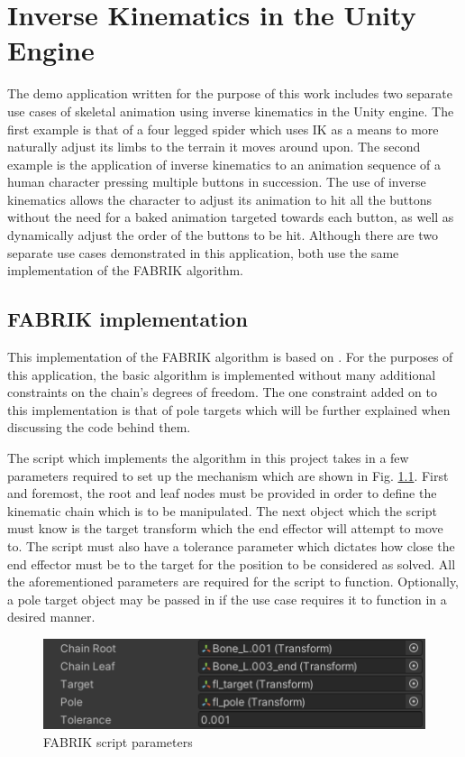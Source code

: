 \chapter{Inverse Kinematics in the Unity Engine} 
The demo application written for the purpose of this work includes two separate
use cases of skeletal animation using inverse kinematics in the Unity engine.
The first example is that of a four legged spider which uses IK as a means to
more naturally adjust its limbs to the terrain it moves around upon. The second
example is the application of inverse kinematics to an animation sequence of
a human character pressing multiple buttons in succession. The use of inverse
kinematics allows the character to adjust its animation to hit all the buttons
without the need for a baked animation targeted towards each button, as well as
dynamically adjust the order of the buttons to be hit. Although there are two
separate use cases demonstrated in this application, both use the same
implementation of the FABRIK algorithm. 


\section{FABRIK implementation}
This implementation of the FABRIK algorithm is based on \cite{Aristidou2011}. For the
purposes of this application, the basic algorithm is implemented without many
additional constraints on the chain's degrees of freedom. The one
constraint added on to this implementation is that of pole targets which will be
further explained when discussing the code behind them.

The script which implements the algorithm in this project takes in a few
parameters required to set up the mechanism which are shown in Fig.
\ref{fig:params}. First and foremost, the root and leaf nodes must be provided
in order to define the kinematic chain which is to be manipulated. The next
object which the script must know is the target transform which the
end effector will attempt to move to. The script must also have a tolerance
parameter which dictates how close the end effector must be to the target for
the position to be considered as solved. All the aforementioned parameters are
required for the script to function. Optionally, a pole target object may be
passed in if the use case requires it to function in a desired manner. 

\begin{figure}
    \centering
    \includegraphics{grafika/parametry_ik.png}
    \caption{FABRIK script parameters}
    \label{fig:params}
\end{figure}

